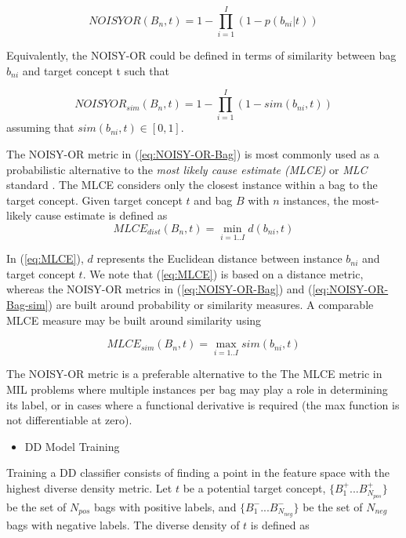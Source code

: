 \documentclass[12pt,dvips]{report}
\numberwithin{equation}{section}
\begin{document}
\begin{equation}
NOISYOR(B_{n},t)=1-\prod_{i=1}^{I}(1-p(b_{ni}\vert t))\label{eq:NOISY-OR-Bag}
\end{equation}

Equivalently, the NOISY-OR could be defined in terms of similarity between bag $b_{ni}$ and target concept t such that

\begin{equation}
NOISYOR_{sim}(B_{n},t)=1-\prod_{i=1}^{I}(1-sim(b_{ni},t))\label{eq:NOISY-OR-Bag-sim}
\end{equation} assuming that $sim(b_{ni},t) \in [0,1]$.

The NOISY-OR metric in (\ref{eq:NOISY-OR-Bag}) is most commonly used
as a probabilistic alternative to the \emph{most likely cause estimate
(MLCE)} or \emph{MLC} standard \cite{maro98}. The MLCE considers only the closest
instance within a bag to the target concept. Given target concept $t$
and bag $B$ with $n$ instances, the most-likely cause estimate is
defined as 
\begin{equation}
MLCE_{dist}(B_{n},t)=\min\limits_{i=1..I}d(b_{ni},t)\label{eq:MLCE}
\end{equation}


In (\ref{eq:MLCE}), $d$ represents the Euclidean distance between instance
$b_{ni}$ and target concept $t$. We note that (\ref{eq:MLCE}) is
based on a distance metric, whereas the NOISY-OR metrics in (\ref{eq:NOISY-OR-Bag}) and (\ref{eq:NOISY-OR-Bag-sim})
are built around probability or similarity measures. A comparable MLCE measure may be
built around similarity using

\begin{equation}
MLCE_{sim}(B_{n},t)=\max\limits_{i=1..I}sim(b_{ni},t)\label{eq:MLCE-sim}
\end{equation}

The NOISY-OR metric is a preferable alternative to the The MLCE metric in MIL problems where multiple instances per bag may play a role in determining its label, or in cases where a functional derivative is required (the max function is not differentiable at zero). 

\begin{itemize}[leftmargin=12 pt]
\item DD Model Training
\end{itemize}

Training a DD classifier consists of finding a point in the feature space with the highest diverse density metric. Let $t$ be a potential target concept, $\{B_{1}^{+}...B_{N_{pos}}^{+}\}$ be the set of $N_{pos}$ bags with positive labels, and $\{B_{1}^{-}...B_{N_{neg}}^{-}\}$ be the set of $N_{neg}$ bags with negative labels. The diverse density of $t$ is defined as 
\end{document}
